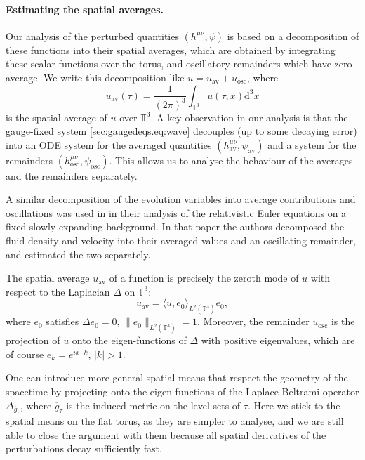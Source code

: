 \documentclass{article}
\newcommand{\TT}{\mathbb{T}}
\newcommand{\osc}{\mathrm{osc}}
\newcommand{\av}{\mathrm{av}}
\newcommand{\de}{\mathrm{d}}
\newcommand{\ol}{\overline}
\begin{document}
\paragraph{Estimating the spatial averages.}
Our analysis of the perturbed quantities $(h^{\mu\nu},\psi)$ is based on a decomposition of these functions into their spatial averages, which are obtained by integrating these scalar functions over the torus, and oscillatory remainders which have zero average. We write this decomposition like $u = u_{\av} + u_{\osc}$, where
\begin{equation}
    u_{\av}(\tau) = \frac{1}{(2\pi)^3}\int_{\TT^3} u(\tau,x)\de^3 x
\end{equation}
is the spatial average of $u$ over $\TT^3$. A key observation in our analysis is that the gauge-fixed system \eqref{sec:gaugedeqs.eq:wave} decouples (up to some decaying error) into an ODE system for the averaged quantities $(h_{\av}^{\mu\nu},\psi_{\av})$ and a system for the remainders $(h_{\osc}^{\mu\nu},\psi_{\osc})$. This allows us to analyse the behaviour of the averages and the remainders separately.
\begin{remark}\label{sec:intro.rmk:linwaveFLRW}
    A similar decomposition of the evolution variables into average contributions and oscillations was used in \cite{Fajetal:decelEulerstab:25} in their analysis of the relativistic Euler equations on a fixed slowly expanding background. In that paper the authors decomposed the fluid density and velocity into their averaged values and an oscillating remainder, and estimated the two separately.
\end{remark}
\begin{remark}
    The spatial average $u_{\av}$ of a function is precisely the zeroth mode of $u$ with respect to the Laplacian $\Delta$ on $\TT^3$:
    \begin{equation}
        u_{\av} = \langle u,e_0\rangle_{L^2(\TT^3)}e_0,
    \end{equation}
    where $e_0$ satisfies $\Delta e_0 = 0$, $\|e_0\|_{L^2(\TT^3)} = 1$. Moreover, the remainder $u_{\osc}$ is the projection of $u$ onto the eigen-functions of $\Delta$ with positive eigenvalues, which are of course $e_k = e^{ix\cdot k}$, $|k| >1$.
    
    One can introduce more general spatial means that respect the geometry of the spacetime by projecting onto the eigen-functions of the Laplace-Beltrami operator $\Delta_{\ol{g}_\tau}$, where $\ol{g}_\tau$ is the induced metric on the level sets of $\tau$. Here we stick to the spatial means on the flat torus, as they are simpler to analyse, and we are still able to close the argument with them because all spatial derivatives of the perturbations decay sufficiently fast.
\end{remark}
\end{document}
